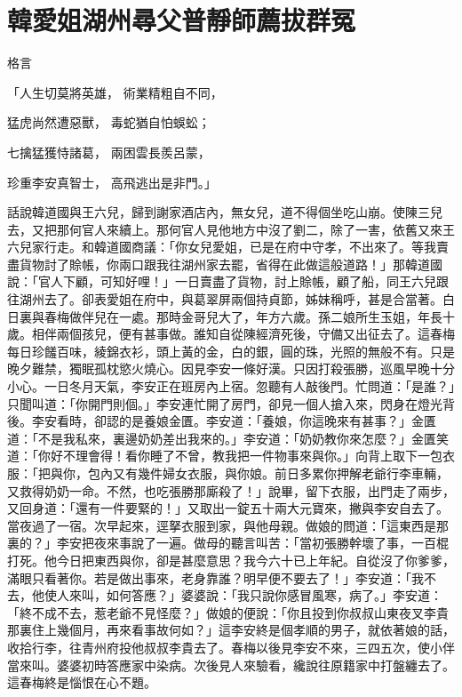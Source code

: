 %

\chapter{韓愛姐湖州尋父\KG 普靜師薦拔群冤}


\begin{showcontents}{}



格言

「人生切莫將英雄，  術業精粗自不同，

猛虎尚然遭惡獸，  毒蛇猶自怕蜈蚣；

七擒猛獲恃諸葛，  兩困雲長羨呂蒙，

珍重李安真智士，  高飛逃出是非門。」

話說韓道國與王六兒，歸到謝家酒店內，無女兒，道不得個坐吃山崩。使陳三兒去，又把那何官人來續上。那何官人見他地方中沒了劉二，除了一害，依舊又來王六兒家行走。和韓道國商議：「你女兒愛姐，已是在府中守孝，不出來了。等我賣盡貨物討了賒帳，你兩口跟我往湖州家去罷，省得在此做這般道路！」那韓道國說：「官人下顧，可知好哩！」一日賣盡了貨物，討上賒帳，顧了船，同王六兒跟往湖州去了。卻表愛姐在府中，與葛翠屏兩個持貞節，姊妹稱呼，甚是合當著。白日裏與春梅做伴兒在一處。那時金哥兒大了，年方六歲。孫二娘所生玉姐，年長十歲。相伴兩個孩兒，便有甚事做。誰知自從陳經濟死後，守備又出征去了。這春梅每日珍饈百味，綾錦衣衫，頭上黃的金，白的銀，圓的珠，光照的無般不有。只是晚夕難禁，獨眠孤枕慾火燒心。因見李安一條好漢。只因打殺張勝，巡風早晚十分小心。一日冬月天氣，李安正在班房內上宿。忽聽有人敲後門。忙問道：「是誰？」只聞叫道：「你開門則個。」李安連忙開了房門，卻見一個人搶入來，閃身在燈光背後。李安看時，卻認的是養娘金匱。李安道：「養娘，你這晚來有甚事？」金匱道：「不是我私來，裏邊奶奶差出我來的。」李安道：「奶奶教你來怎麼？」金匱笑道：「你好不理會得！看你睡了不曾，教我把一件物事來與你。」向背上取下一包衣服：「把與你，包內又有幾件婦女衣服，與你娘。前日多累你押解老爺行李車輛，又救得奶奶一命。不然，也吃張勝那廝殺了！」說畢，留下衣服，出門走了兩步，又回身道：「還有一件要緊的！」又取出一錠五十兩大元寶來，撇與李安自去了。當夜過了一宿。次早起來，逕拏衣服到家，與他母親。做娘的問道：「這東西是那裏的？」李安把夜來事說了一遍。做母的聽言叫苦：「當初張勝幹壞了事，一百棍打死。他今日把東西與你，卻是甚麼意思？我今六十已上年紀。自從沒了你爹爹，滿眼只看著你。若是做出事來，老身靠誰？明早便不要去了！」李安道：「我不去，他使人來叫，如何答應？」婆婆說：「我只說你感冒風寒，病了。」李安道：「終不成不去，惹老爺不見怪麼？」做娘的便說：「你且投到你叔叔山東夜叉李貴那裏住上幾個月，再來看事故何如？」這李安終是個孝順的男子，就依著娘的話，收拾行李，往青州府投他叔叔李貴去了。春梅以後見李安不來，三四五次，使小伴當來叫。婆婆初時答應家中染病。次後見人來驗看，纔說往原籍家中打盤纏去了。這春梅終是惱恨在心不題。


\end{showcontents}
